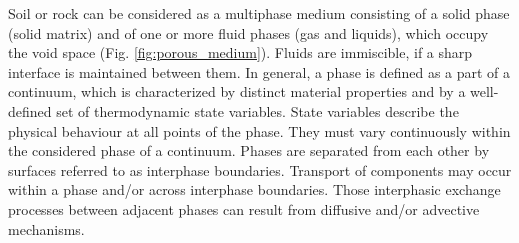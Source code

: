 
Soil or rock can be considered as a multiphase medium consisting
of a solid phase (solid matrix) and of one or more fluid phases
(gas and liquids), which occupy the void space (Fig.
\ref{fig:porous_medium}). Fluids are immiscible, if a sharp interface is maintained between them. In
general, a phase is defined as a part of a continuum, which is
characterized by distinct material properties and by a
well-defined set of thermodynamic state variables. State variables
describe the physical behaviour at all points of the phase. They
must vary continuously within the considered phase of a continuum.
Phases are separated from each other by surfaces referred to as
interphase boundaries. Transport of components may occur within a
phase and/or across interphase boundaries. Those
interphasic exchange processes between
adjacent phases can result from diffusive and/or advective
mechanisms.

